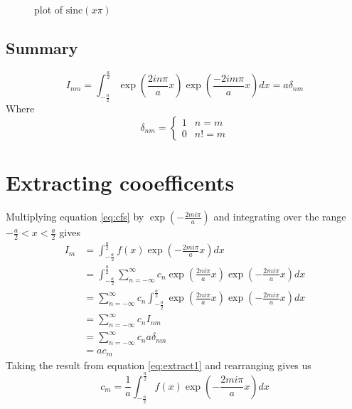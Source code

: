 \begin{figure}[h]
\centering
{}
\caption{plot of $\text{sinc}(x\pi)$}
\end{figure}
\newpage
\subsection{Summary}
\begin{mdframed}
\begin{equation*}
I_{nm} = \int_{-\frac{a}{2}}^{\frac{a}{2}} \exp \left( \frac{2 i n \pi}{a} x\right) \exp \left( \frac{-2 i m \pi}{a} x\right) dx = a \delta_{nm}
\end{equation*}
Where
\begin{equation*}
\delta_{nm} = \left\{
  \begin{array}{lr}
    1 & n = m\\
    0 & n != m
  \end{array}
\right.
\end{equation*}
\end{mdframed}
\section{Extracting cooefficents}
Multiplying equation \ref{eq:cfs} by $\exp\left(-\frac{2mi\pi}{a}\right)$ and
integrating over the range $-\frac{a}{2}<x<\frac{a}{2}$ gives
\begin{subequations}
  \label{eq:extract1}
\begin{align}
\label{eq:cfs2}
I_{m}&=\int_{-\frac{a}{2}}^{\frac{a}{2}} f(x) \exp\left(-\frac{2mi\pi}{a} x\right) dx \\
&= \int_{-\frac{a}{2}}^{\frac{a}{2}} \sum_{n=-\infty}^{\infty} c_n \exp\left(\frac{2ni\pi}{a}x\right) \exp\left(-\frac{2mi\pi}{a} x\right) dx \\
&=\sum_{n=-\infty}^{\infty} c_n \int_{-\frac{a}{2}}^{\frac{a}{2}} \exp\left(\frac{2ni\pi}{a}x\right) \exp\left(-\frac{2mi\pi}{a}x\right) dx \\
&=\sum_{n=-\infty}^{\infty} c_n I_{nm} \\
&=\sum_{n=-\infty}^{\infty} c_n a \delta_{nm} \\
&= a c_m
\end{align}
\end{subequations}
Taking the result from equation \ref{eq:extract1} and rearranging gives us
\begin{equation}
c_m = \frac{1}{a}\int_{-\frac{a}{2}}^{\frac{a}{2}} f(x) \exp\left(-\frac{2mi\pi}{a}x\right) dx
\end{equation}
\newpage

